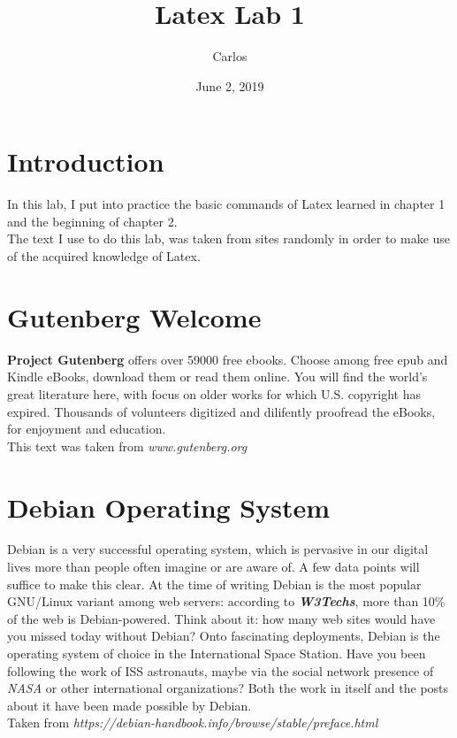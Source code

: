 \documentclass[a4paper,11pt]{article}
\begin{document}
\title{Latex Lab 1}
\author{Carlos}
\date{June 2, 2019}
\maketitle

\section{Introduction}
In this lab, I put into practice the basic commands of
Latex learned in chapter 1 and the beginning of chapter 2.
\\ %

The text I use to do this lab, was taken from sites
randomly in order to make use of the acquired knowledge of
Latex.

\section{Gutenberg Welcome}
\textbf{Project Gutenberg} offers over 59000 free ebooks.
Choose among free epub and Kindle eBooks, download them
or read them online. You will find the world's great
literature here, with focus on older works for which U.S.
copyright has expired. Thousands of volunteers digitized
and dilifently proofread the eBooks, for enjoyment and
education.
\\

This text was taken from \emph{www.gutenberg.org}

\section{Debian Operating System}
Debian is a very successful operating system, which is
pervasive in our digital lives more than people often 
imagine or are aware of. A few data points will suffice
to make this clear. At the time of writing Debian is the
most popular GNU/Linux variant among web servers:
according to \textit{\textbf{W3Techs}}, more than 10\% of
the web is Debian-powered. Think about it: how many web
sites would have you missed today without Debian? Onto
fascinating deployments, Debian is the operating system
of choice in the International Space Station. Have you
been following the work of ISS astronauts, maybe via the
social network presence of \textsl{NASA} or other
international organizations? Both the work in itself and
the posts about it have been made possible by Debian.
\\

Taken from \emph{https://debian-handbook.info/browse/stable/preface.html}
\end{document}
